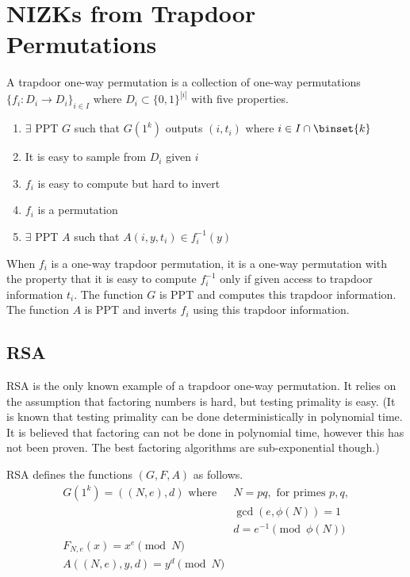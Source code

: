 \documentclass[12pt]{tufte-book}
\begin{document}
\section{NIZKs from Trapdoor Permutations}

\begin{definition}
A trapdoor one-way permutation is a collection of one-way permutations $\{f_i : D_i \rightarrow D_i\}_{i \in I}$ where $D_i \subset \{0,1\}^{|i|}$ with
five properties.

\begin{enumerate}
\item $\exists$ PPT $G$ such that $G(1^k)$ outputs $(i,t_i)$ where $i \in I\cap \binset{k}$
\item It is easy to sample from $D_i$ given $i$ 
\item $f_i$ is easy to compute but hard to invert
\item  $f_i$ is a permutation
\item $\exists$ PPT $A$ such that $A(i, y, t_i)\in f_i^{-1}(y)$
\end{enumerate}
\end{definition}

When $f_i$ is a one-way trapdoor permutation, it is a one-way permutation with
the property that it is easy to compute $f_i^{-1}$ only if given access to trapdoor
information $t_i$. The function $G$ is PPT and computes this trapdoor information.
The function $A$ is PPT and inverts $f_i$ using this trapdoor information.

\subsection{RSA}

RSA is the only known example of a trapdoor one-way permutation.
It relies on the assumption that factoring numbers is hard,
but testing primality is easy. (It is known that testing primality can be done
deterministically in polynomial time. It is believed that factoring can not be done in
polynomial time, however this has not been proven. The best factoring algorithms
are sub-exponential though.)

\begin{definition}
RSA defines the functions $(G, F, A)$ as follows.
\begin{align*}
G(1^k) = ((N, e), d) \,\,\text{where} \,\,& N=pq, \,\, \text{for primes $p,q$},  \\
& \gcd(e,\phi(N))=1 \\
& d = e^{-1} \pmod{\phi(N)} \\
F_{N,e}(x) = x^e \pmod{N} & \\
A((N,e),y, d) = y^d \pmod{N} &
\end{align*}
\end{definition}
\end{document}
